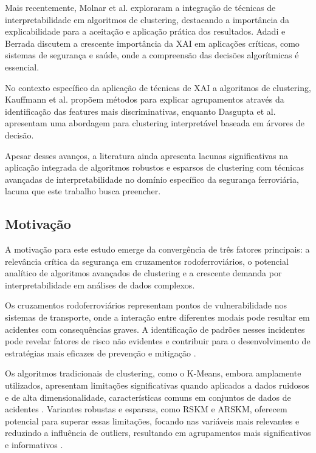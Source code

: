 \documentclass[conference]{IEEEtran}
\begin{document}
Mais recentemente, Molnar et al. \cite{molnar2020interpretable} exploraram a integração de técnicas de interpretabilidade em algoritmos de clustering, destacando a importância da explicabilidade para a aceitação e aplicação prática dos resultados. Adadi e Berrada \cite{adadi2018peeking} discutem a crescente importância da XAI em aplicações críticas, como sistemas de segurança e saúde, onde a compreensão das decisões algorítmicas é essencial.

No contexto específico da aplicação de técnicas de XAI a algoritmos de clustering, Kauffmann et al. \cite{kauffmann2019clustering} propõem métodos para explicar agrupamentos através da identificação das features mais discriminativas, enquanto Dasgupta et al. \cite{dasgupta2020explainable} apresentam uma abordagem para clustering interpretável baseada em árvores de decisão.

Apesar desses avanços, a literatura ainda apresenta lacunas significativas na aplicação integrada de algoritmos robustos e esparsos de clustering com técnicas avançadas de interpretabilidade no domínio específico da segurança ferroviária, lacuna que este trabalho busca preencher.

\subsection{Motivação}
A motivação para este estudo emerge da convergência de três fatores principais: a relevância crítica da segurança em cruzamentos rodoferroviários, o potencial analítico de algoritmos avançados de clustering e a crescente demanda por interpretabilidade em análises de dados complexos.

Os cruzamentos rodoferroviários representam pontos de vulnerabilidade nos sistemas de transporte, onde a interação entre diferentes modais pode resultar em acidentes com consequências graves. A identificação de padrões nesses incidentes pode revelar fatores de risco não evidentes e contribuir para o desenvolvimento de estratégias mais eficazes de prevenção e mitigação \cite{liang2018analysis}.

Os algoritmos tradicionais de clustering, como o K-Means, embora amplamente utilizados, apresentam limitações significativas quando aplicados a dados ruidosos e de alta dimensionalidade, características comuns em conjuntos de dados de acidentes \cite{witten2010framework}. Variantes robustas e esparsas, como RSKM e ARSKM, oferecem potencial para superar essas limitações, focando nas variáveis mais relevantes e reduzindo a influência de outliers, resultando em agrupamentos mais significativos e informativos \cite{sun2018adaptive}.
\end{document}
